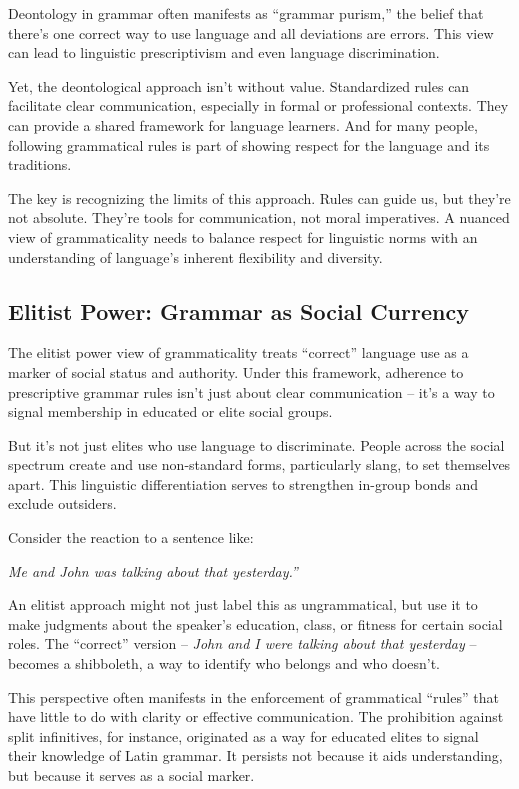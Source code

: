 Deontology in grammar often manifests as ``grammar purism,'' the belief that there's one correct way to use language and all deviations are errors. This view can lead to linguistic prescriptivism and even language discrimination.

Yet, the deontological approach isn't without value. Standardized rules can facilitate clear communication, especially in formal or professional contexts. They can provide a shared framework for language learners. And for many people, following grammatical rules is part of showing respect for the language and its traditions.

The key is recognizing the limits of this approach. Rules can guide us, but they're not absolute. They're tools for communication, not moral imperatives. A nuanced view of grammaticality needs to balance respect for linguistic norms with an understanding of language's inherent flexibility and diversity.

\subsection{Elitist Power: Grammar as Social Currency}

The elitist power view of grammaticality treats ``correct'' language use as a marker of social status and authority. Under this framework, adherence to prescriptive grammar rules isn't just about clear communication -- it's a way to signal membership in educated or elite social groups.

But it's not just elites who use language to discriminate. People across the social spectrum create and use non-standard forms, particularly slang, to set themselves apart. This linguistic differentiation serves to strengthen in-group bonds and exclude outsiders.

Consider the reaction to a sentence like:

\ea
\textit{Me and John was talking about that yesterday.''}
\z

An elitist approach might not just label this as ungrammatical, but use it to make judgments about the speaker's education, class, or fitness for certain social roles. The ``correct'' version -- \textit{John and I were talking about that yesterday} -- becomes a shibboleth, a way to identify who belongs and who doesn't.

This perspective often manifests in the enforcement of grammatical ``rules'' that have little to do with clarity or effective communication. The prohibition against split infinitives, for instance, originated as a way for educated elites to signal their knowledge of Latin grammar. It persists not because it aids understanding, but because it serves as a social marker.

